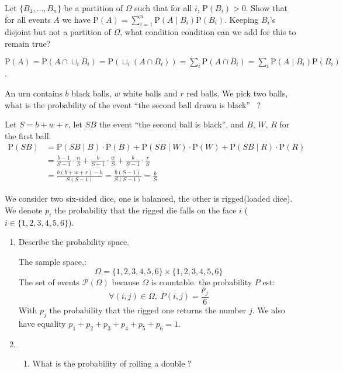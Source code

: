 \documentclass[a4paper,11pt]{exam}
\renewcommand{\P}{\mathrm{P}}
\begin{document}
\begin{questions}
\question
Let $\{B_1,\dots,B_n\}$ be a partition of $\Omega$ such that for all $i$,
$\P(B_i) > 0$.
Show that for all events $A$ we have
$
\P(A) = \sum_{i = 1}^n \P(A \mid B_i) \P(B_i)
$. 
Keeping $B_i$'s disjoint but not a partition of $\Omega$, what condition condition can we add for this to remain true?
\begin{solution}
	$\P(A)
	= \P(A \cap \sqcup_iB_i)
	= \P(\sqcup_i(A \cap B_i))
	= \sum_{i} \P(A \cap B_i)
	= \sum_{i} \P(A \mid B_i)\P(B_i)$.
\end{solution} 

\question
An urn contains $ b $ black balls, $ w $ white balls and $ r $ red balls.
We pick two balls, what is the probability of the event ``the second ball drawn is
black'' ~?

\begin{solution}
	Let $S = b + w + r$, let $SB$ the event ``the second ball is black'', and $B$, $W$, $R$ for the first ball.
	\begin{align*}
	\P(SB)
	&= \P(SB \mid B)\cdot\P(B) + \P(SB \mid W)\cdot\P(W)
	+ \P(SB \mid R)\cdot\P(R)\\
	&= \frac{b-1}{S - 1} \cdot \frac{n}{S}
	+ \frac{b}{S - 1} \cdot \frac{w}{S} + \frac{b}{S - 1} \cdot \frac{r}{S}\\
	&= \frac{b(b+w+r) - b}{S(S-1)} = \frac{b(S-1)}{S(S-1)} = \frac{b}{S}
	\end{align*}
\end{solution} 


\question
We consider two six-sided dice, one is balanced, the other is rigged(loaded dice).
We denote $ p_i $ the probability that the rigged die falls on the face  $i$ ($i\in\{1,2,3,4,5,6\}$).
\begin{enumerate}
	\item Describe the probability space.
	
	\begin{solution}
		The sample space,:
		\[
		\Omega = \{1,2,3,4,5,6\} ×\{1,2,3,4,5,6\}
		\]
		The set of events $\mathcal P(\Omega)$ because $\Omega$ is countable.
		the probability $P$ est:
		\[
		\forall (i,j) \in \Omega,\;  P(i,j) = \frac{p_j}{6}
		\]
		With $p_j$ the probability that the rigged  one returns the number $j$.
		We also have equality $p_1+p_2+p_3+p_4+p_5+p_6 = 1$.
	\end{solution}
	
	\item
	\begin{enumerate}
		\item What is the probability of rolling a double ?
		

\end{enumerate}
\end{enumerate}
\end{questions}
\end{document}
